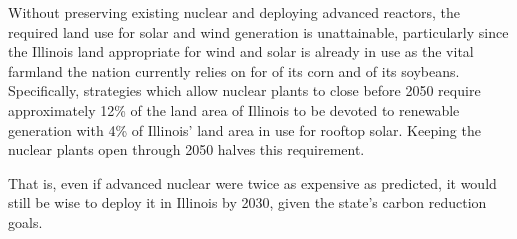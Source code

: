 Without preserving existing nuclear and deploying advanced reactors, the 
required land use for solar and wind generation is 
unattainable, particularly since the Illinois land appropriate for wind and solar 
is already in use as the vital farmland the nation currently relies on for  of its 
corn and  of its soybeans.
Specifically, strategies which allow nuclear plants to close before 2050 
require approximately 12\% of the land area of Illinois to be devoted to 
renewable generation  with  4\% of Illinois' land area in use for rooftop solar. 
Keeping the nuclear plants open through 2050 halves this requirement.

That is, even if advanced nuclear were twice as expensive as predicted, it 
would still be wise to deploy it in Illinois by 2030, given the state's carbon 
reduction goals.



